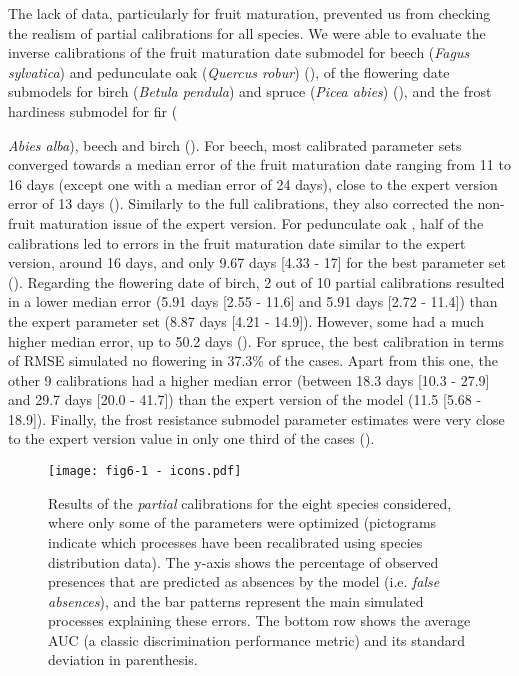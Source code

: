 \documentclass[preprint,12pt,authoryear]{elsarticle}
\begin{document}
The lack of data, particularly for fruit maturation, prevented us from checking the realism of partial calibrations for all species. We were able to evaluate the inverse calibrations of the fruit maturation date submodel for beech (\emph{Fagus sylvatica}) and pedunculate oak (\emph{Quercus robur}) (), of the flowering date submodels for birch (\emph{Betula pendula}) and spruce  (\emph{Picea abies}) (), and the frost hardiness submodel for fir ({\emph{Abies alba}), beech and birch (). For beech, most calibrated parameter sets converged towards a median error of the fruit maturation date ranging from 11 to 16 days (except one with a median error of 24 days), close to the expert version error of 13 days (). Similarly to the full calibrations, they also corrected the non-fruit maturation issue of the expert version. For pedunculate oak , half of the calibrations led to errors in the fruit maturation date similar to the expert version, around 16 days, and only 9.67 days [4.33 - 17] for the best parameter set (). Regarding the flowering date of birch, 2 out of 10 partial calibrations resulted in a lower median error (5.91 days [2.55 - 11.6] and 5.91 days [2.72 - 11.4]) than the expert parameter set (8.87 days [4.21 - 14.9]). However, some had a much higher median error, up to 50.2 days (). For spruce, the best calibration in terms of RMSE simulated no flowering in 37.3\% of the cases. Apart from this one, the other 9 calibrations had a higher median error (between 18.3 days [10.3 - 27.9] and 29.7 days [20.0 - 41.7]) than the expert version of the model (11.5 [5.68 - 18.9]). Finally, the frost resistance submodel parameter estimates were very close to the expert version value in only one third of the cases ().

\begin{figure}[hb]
\centering
\centerline{\texttt{[image: fig6-1 - icons.pdf]}}
\caption{Results of the \emph{partial} calibrations for the eight species considered, where only some of the parameters were optimized (pictograms indicate which processes have been recalibrated using species distribution data). The y-axis shows the percentage of observed presences that are predicted as absences by the model (i.e. \emph{false absences}), and the bar patterns represent the main simulated processes explaining these errors. The bottom row shows the average AUC (a classic discrimination performance metric) and its standard deviation in parenthesis.}
\label{fig:4}
\end{figure}

}
\end{document}
